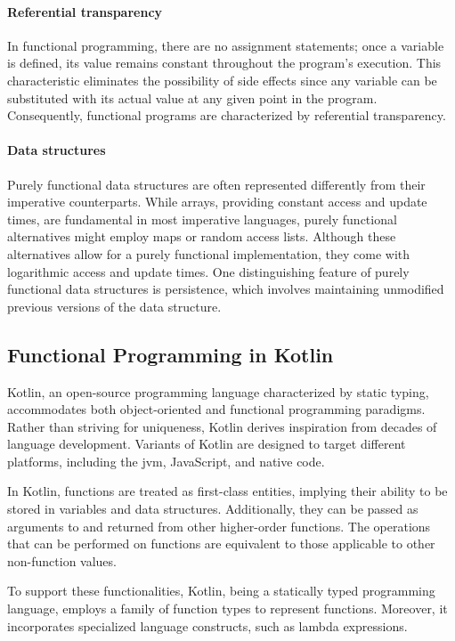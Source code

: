 \documentclass[12pt,a4paper,openright,twoside]{book}
\begin{document}
\paragraph{Referential transparency}

In functional programming, there are no assignment statements; once a variable is defined, its value remains constant throughout the program's execution. This characteristic eliminates the possibility of side effects since any variable can be substituted with its actual value at any given point in the program. Consequently, functional programs are characterized by referential transparency.

\paragraph{Data structures}

Purely functional data structures are often represented differently from their imperative counterparts. While arrays, providing constant access and update times, are fundamental in most imperative languages, purely functional alternatives might employ maps or random access lists. Although these alternatives allow for a purely functional implementation, they come with logarithmic access and update times. One distinguishing feature of purely functional data structures is persistence, which involves maintaining unmodified previous versions of the data structure.

\subsection{Functional Programming in Kotlin}

Kotlin, an open-source programming language characterized by static typing, accommodates both object-oriented and functional programming paradigms. Rather than striving for uniqueness, Kotlin derives inspiration from decades of language development. Variants of Kotlin are designed to target different platforms, including the \ac{jvm}, JavaScript, and native code.

In Kotlin, functions are treated as first-class entities, implying their ability to be stored in variables and data structures. Additionally, they can be passed as arguments to and returned from other higher-order functions. The operations that can be performed on functions are equivalent to those applicable to other non-function values.

To support these functionalities, Kotlin, being a statically typed programming language, employs a family of function types to represent functions. Moreover, it incorporates specialized language constructs, such as lambda expressions.
\end{document}
